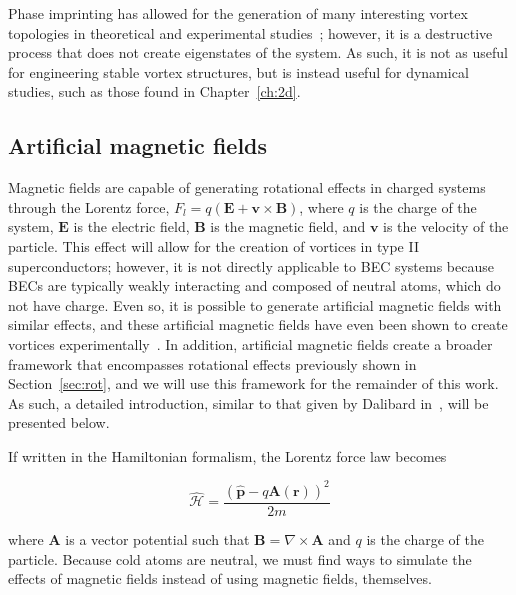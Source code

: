 Phase imprinting has allowed for the generation of many interesting vortex topologies in theoretical and experimental studies~\cite{white2014, maucher2016}; however, it is a destructive process that does not create eigenstates of the system.
As such, it is not as useful for engineering stable vortex structures, but is instead useful for dynamical studies, such as those found in Chapter~\ref{ch:2d}.

\subsection{Artificial magnetic fields}
\label{sec:gauge}

Magnetic fields are capable of generating rotational effects in charged systems through the Lorentz force, $F_l = q(\mathbf{E} + \mathbf{v} \times \mathbf{B})$, where $q$ is the charge of the system, $\mathbf{E}$ is the electric field, $\mathbf{B}$ is the magnetic field, and $\mathbf{v}$ is the velocity of the particle.
This effect will allow for the creation of vortices in type II superconductors; however, it is not directly applicable to BEC systems because BECs are typically weakly interacting and composed of neutral atoms, which do not have charge.
Even so, it is possible to generate artificial magnetic fields with similar effects, and these artificial magnetic fields have even been shown to create vortices experimentally~\cite{lin2009}.
In addition, artificial magnetic fields create a broader framework that encompasses rotational effects previously shown in Section~\ref{sec:rot}, and we will use this framework for the remainder of this work.
As such, a detailed introduction, similar to that given by Dalibard in~\cite{dalibard2015}, will be presented below.

If written in the Hamiltonian formalism, the Lorentz force law becomes

\begin{equation}
\mathcal{\hat{H}} = \frac{(\mathbf{\hat p} - q\mathbf{A}(\mathbf{r}))^2}{2m}
\end{equation}

\noindent where $\mathbf{A}$ is a vector potential such that $\mathbf{B} = \nabla \times \mathbf{A}$ and $q$ is the charge of the particle.
Because cold atoms are neutral, we must find ways to simulate the effects of magnetic fields instead of using magnetic fields, themselves.

